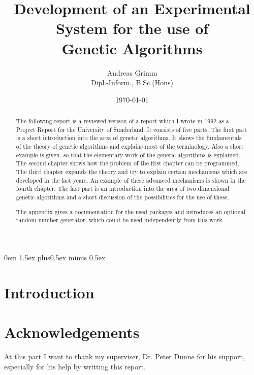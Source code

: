 
\author{{\sc Andreas Grimm}\\
{\small Dipl.-Inform., B.Sc.(Hons)}}

\def\bs{\char'134 } %
\title{\sc Development of an Experimental
           System for the use of\\
           Genetic Algorithms}
\frenchspacing
\sloppy
\date{\today}
\pagestyle{headings}
\parindent0em \parskip1.5ex plus0.5ex minus 0.5ex
\renewcommand{\baselinestretch}{1.5}

\newtheorem{definition}{Definition}[chapter]
\newtheorem{satz}{Satz}[chapter]
\newtheorem{hypothese}{Hypothese}[chapter]
\maketitle
\begin{abstract}
The following report is a reviewed verison of a report which I wrote in 1992 as
a Project Report for the University of Sunderland. 
It consists of five parts. The first part is a short introduction
into the area of genetic algorithms. It shows the fundamentals of the theory
of genetic algorithms and explains most of the terminology. Also a short example
is given, so that the elementary work of the genetic algorithms is explained.
The second chapter shows how the problem of the first chapter can be programmed.
The third chapter expands the theory and try to explain certain mechanisms which
are developed in the last years. An example of these advanced mechanisms is shown
in the fourth chapter. The last part is an introduction into the area of two
dimensional genetic algorithms and a short discussion of the possibilities for
the use of these.

The appendix gives a documentation for the used packages and introduces an
optional random number generator, which could be used independently from this
work.
\end{abstract}
\tableofcontents
\newpage
{}
\section{Introduction}

\section{Acknowledgements}
At this part I want to thank my superviser, Dr. Peter Dunne for his support,
especially for his help by writting this report.
